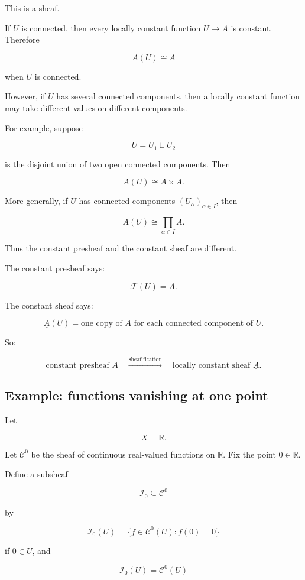\documentclass[12pt,a4paper]{article}
\theoremstyle{notespace}
\newcommand{\F}{\mathcal F}
\newcommand{\C}{\mathcal C}
\newcommand{\I}{\mathcal I}
\begin{document}
	This is a sheaf.
	
	If $U$ is connected, then every locally constant function $U\to A$ is constant.
	Therefore
	
	\[
	\underline A(U)\cong A
	\]
	
	when $U$ is connected.
	
	However, if $U$ has several connected components, then a locally constant
	function may take different values on different components.
	
	For example, suppose
	
	\[
	U=U_1\sqcup U_2
	\]
	
	is the disjoint union of two open connected components. Then
	
	\[
	\underline A(U)\cong A\times A.
	\]
	
	More generally, if $U$ has connected components $(U_\alpha)_{\alpha\in I}$,
	then
	
	\[
	\underline A(U)
	\cong
	\prod_{\alpha\in I} A.
	\]
	
	Thus the constant presheaf and the constant sheaf are different.
	
	The constant presheaf says:
	
	\[
	\F(U)=A.
	\]
	
	The constant sheaf says:
	
	\[
	\underline A(U)
	=
	\text{one copy of } A \text{ for each connected component of } U.
	\]
	
	So:
	
	\[
	\boxed{
		\text{constant presheaf } A
		\quad
		\xrightarrow{\text{sheafification}}
		\quad
		\text{locally constant sheaf } \underline A.
	}
	\]
	
	\subsection{Example: functions vanishing at one point}
	
	Let
	
	\[
	X=\mathbb R.
	\]
	
	Let $\C^0$ be the sheaf of continuous real-valued functions on $\mathbb R$.
	Fix the point $0\in\mathbb R$.
	
	Define a subsheaf
	
	\[
	\I_0\subseteq \C^0
	\]
	
	by
	
	\[
	\I_0(U)
	=
	\{f\in \C^0(U): f(0)=0\}
	\]
	
	if $0\in U$, and
	
	\[
	\I_0(U)=\C^0(U)
	\]
	
\end{document}
